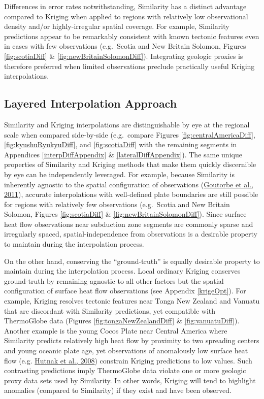 Differences in error rates notwithstanding, Similarity has a distinct advantage compared to Kriging when applied to regions with relatively low observational density and/or highly-irregular spatial coverage. For example, Similarity predictions appear to be remarkably consistent with known tectonic features even in cases with few observations (e.g.~Scotia and New Britain Solomon, Figures \ref{fig:scotiaDiff} \& \ref{fig:newBritainSolomonDiff}). Integrating geologic proxies is therefore preferred when limited observations preclude practically useful Kriging interpolations.

\hypertarget{layered-interpolation-approach}{%
\subsection{Layered Interpolation Approach}\label{layered-interpolation-approach}}

Similarity and Kriging interpolations are distinguishable by eye at the regional scale when compared side-by-side (e.g.~compare Figures \ref{fig:centralAmericaDiff}, \ref{fig:kyushuRyukyuDiff}, and \ref{fig:scotiaDiff} with the remaining segments in Appendices \ref{interpDiffAppendix} \& \ref{lateralDiffAppendix}). The same unique properties of Similarity and Kriging methods that make them quickly discernible by eye can be independently leveraged. For example, because Similarity is inherently agnostic to the spatial configuration of observations (\protect\hyperlink{ref-goutorbe2011}{Goutorbe et al., 2011}), accurate interpolations with well-defined plate boundaries are still possible for regions with relatively few observations (e.g.~Scotia and New Britain Solomon, Figures \ref{fig:scotiaDiff} \& \ref{fig:newBritainSolomonDiff}). Since surface heat flow observations near subduction zone segments are commonly sparse and irregularly spaced, spatial-independence from observations is a desirable property to maintain during the interpolation process.

On the other hand, conserving the ``ground-truth'' is equally desirable property to maintain during the interpolation process. Local ordinary Kriging conserves ground-truth by remaining agnostic to all other factors but the spatial configuration of surface heat flow observations (see Appendix \ref{krigeOpt}). For example, Kriging resolves tectonic features near Tonga New Zealand and Vanuatu that are discordant with Similarity predictions, yet compatible with ThermoGlobe data (Figures \ref{fig:tongaNewZealandDiff} \& \ref{fig:vanuatuDiff}). Another example is the young Cocos Plate near Central America where Similarity predicts relatively high heat flow by proximity to two spreading centers and young oceanic plate age, yet observations of anomalously low surface heat flow (e.g. \protect\hyperlink{ref-hutnak2008}{Hutnak et al., 2008}) constrain Kriging predictions to low values. Such contrasting predictions imply ThermoGlobe data violate one or more geologic proxy data sets used by Similarity. In other words, Kriging will tend to highlight anomalies (compared to Similarity) if they exist and have been observed.

